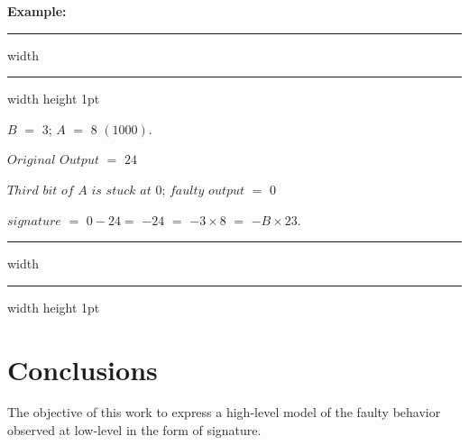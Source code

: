 \hspace{-0.3 cm}\textbf{Example:}
\hrule height 2pt width \hsize \kern 1pt \hrule width \hsize height 1pt


$B$ $=$ $3$;  $A$ $=$ $8$ $(1000)$. 

$Original$ $Output$ $=$ $24$ 

$Third$ $bit$ $of$ $A$ $is$ $stuck$ $at$ $0$;  $faulty$ $output$ $=$ $0$ 

$signature$ $=$ $ 0 - 24 $$=$ $-24$ $=$ $-3\times 8$ $=$ $-B \times 23$.




\hrule height 2pt width \hsize \kern 1pt \hrule width \hsize height 1pt











\section{Conclusions}

The objective of this work to express a high-level model of the faulty behavior observed at low-level in the form of signature. 